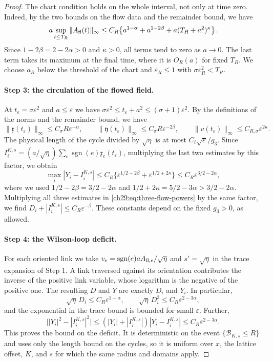 \begin{proof}
The chart condition holds on the whole interval, not only at time zero. Indeed, by the two bounds on the flow data and the remainder bound, we have
\[
 a\sup_{t\le T_R}\|A_{\rm fl}(t)\|_\infty\le C_R\bigl\{a^{1-\alpha}+a^{1-2\beta}+a(T_R+a^2)^\kappa\bigr\}.
\]
Since $1-2\beta=2-2\alpha>0$ and $\kappa>0$, all terms tend to zero as $a\to0$. The last term takes its maximum at the final time, where it is $O_R(a)$ for fixed $T_R$. We choose $a_R$ below the threshold of the chart and $\varepsilon_R\le1$ with $\sigma\varepsilon_R^2<T_R$.

\paragraph{Step 3: the circulation of the flowed field.}
At $t_\varepsilon=\sigma\varepsilon^2$ and $a\le\varepsilon$ we have $\sigma\varepsilon^2\le t_\varepsilon+a^2\le(\sigma+1)\varepsilon^2$. By the definitions of the norms and the remainder bound, we have
\begin{equation}\label{ch29:eq:three-flow-powers}
 \|\mathfrak x(t_\varepsilon)\|_\infty\le C_\sigma R\varepsilon^{-\alpha},\qquad \|\mathfrak y(t_\varepsilon)\|_\infty\le C_\sigma R\varepsilon^{-2\beta},\qquad \|v(t_\varepsilon)\|_\infty\le C_{R,\sigma}\varepsilon^{2\kappa}.
\end{equation}
The physical length of the cycle divided by $\sqrt\eta$ is at most $C_\ell\sqrt\varepsilon/g_3$. Since $I_i^{K,s}=(a/\sqrt\eta)\sum_e\operatorname{sgn}(e)\mathfrak x_e(t_\varepsilon)$, multiplying the last two estimates by this factor, we obtain
\[
 \max_i|Y_i-I_i^{K,s}|\le C_R\bigl\{\varepsilon^{1/2-2\beta}+\varepsilon^{1/2+2\kappa}\bigr\}\le C_R\varepsilon^{3/2-2\alpha},
\]
where we used $1/2-2\beta=3/2-2\alpha$ and $1/2+2\kappa=5/2-3\alpha>3/2-2\alpha$. Multiplying all three estimates in \eqref{ch29:eq:three-flow-powers} by the same factor, we find $D_i+|I_i^{K,s}|\le C_R\varepsilon^{-\beta}$. These constants depend on the fixed $g_3>0$, as allowed.

\paragraph{Step 4: the Wilson-loop deficit.}
For each oriented link we take $v_e=\operatorname{sgn}(e)aA_{{\rm fl},e}/\sqrt\eta$ and $s'=\sqrt\eta$ in the trace expansion of Step 1. A link traversed against its orientation contributes the inverse of the positive link variable, whose logarithm is the negative of the positive one. The resulting $D$ and $Y$ are exactly $D_i$ and $Y_i$. In particular,
\[
 \sqrt\eta\,D_i\le C_R\varepsilon^{1-\alpha},\qquad \sqrt\eta\,D_i^3\le C_R\varepsilon^{2-3\alpha},
\]
and the exponential in the trace bound is bounded for small $\varepsilon$. Further,
\[
 \bigl||Y_i|^2-|I_i^{K,s}|^2\bigr|\le(|Y_i|+|I_i^{K,s}|)|Y_i-I_i^{K,s}|\le C_R\varepsilon^{2-3\alpha}.
\]
This proves the bound on the deficit. It is deterministic on the event $\{\mathcal B_{K,s}\le R\}$ and uses only the length bound on the cycles, so it is uniform over $x$, the lattice offset, $K$, and $s$ for which the same radius and domains apply.


\end{proof}
